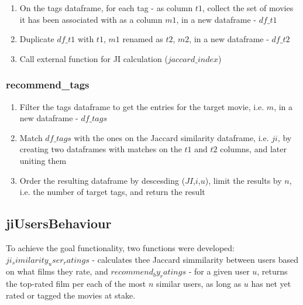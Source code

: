\documentclass[10pt,twocolumn]{article}
\begin{document}
\begin{enumerate}
    \itemsep0em
    \item On the tags dataframe, for each tag - as column $t1$, collect the set of movies it has been associated with as a column $m1$, in a new dataframe - $df\_t1$
    \item Duplicate $df\_t1$ with $t1$, $m1$ renamed as $t2$, $m2$, in a new dataframe - $df\_t2$
    \item Call external function for JI calculation ($jaccard\_index$)
\end{enumerate}

\subsubsection{recommend\_tags}

\begin{enumerate}
    \itemsep0em
    \item Filter the tags dataframe to get the entries for the target movie, i.e. $m$, in a new dataframe - $df\_tags$
    \item Match $df\_tags$ with the ones on the Jaccard similarity dataframe, i.e. $ji$, by creating two dataframes with matches on the $t1$ and $t2$ columns, and later uniting them
    \item Order the resulting dataframe by descesding ($JI$,$i$,$u$), limit the results by $n$, i.e. the number of target tags, and return the result
\end{enumerate}

\subsection{jiUsersBehaviour}

To achieve the goal functionality, two functions were developed: $ji_similarity_user_ratings$ - calculates thee Jaccard simmilarity between users based on what films they rate, and $recommend_by_ratings$ - for a given user $u$, returns the top-rated film per each of the most $n$ similar users, as long as $u$ has net yet rated or tagged the movies at stake.
\end{document}
